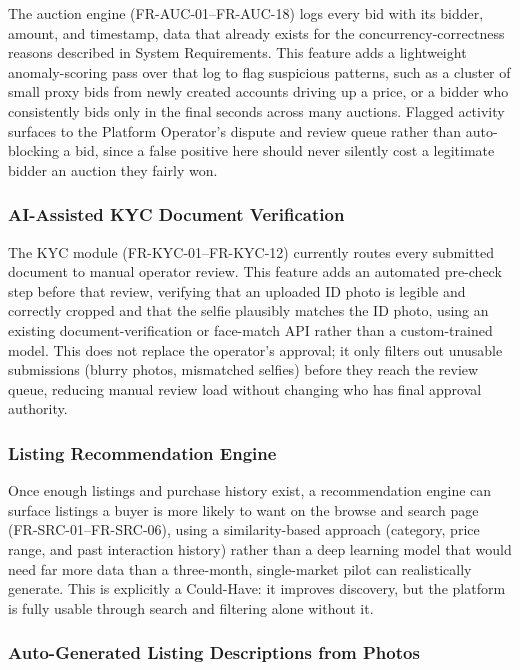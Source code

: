 \documentclass[11pt,a4paper]{article}
\begin{document}
The auction engine (FR-AUC-01--FR-AUC-18) logs every bid with its bidder, amount, and timestamp, data that
already exists for the concurrency-correctness reasons described in System Requirements. This feature
adds a lightweight anomaly-scoring pass over that log to flag suspicious patterns, such as a cluster of
small proxy bids from newly created accounts driving up a price, or a bidder who consistently bids only
in the final seconds across many auctions. Flagged activity surfaces to the Platform Operator's
dispute and review queue rather than auto-blocking a bid, since a false positive here should never
silently cost a legitimate bidder an auction they fairly won.

\subsubsection*{AI-Assisted KYC Document Verification}

The KYC module (FR-KYC-01--FR-KYC-12) currently routes every submitted document to manual operator review. This
feature adds an automated pre-check step before that review, verifying that an uploaded ID photo is
legible and correctly cropped and that the selfie plausibly matches the ID photo, using an existing
document-verification or face-match API rather than a custom-trained model. This does not replace the
operator's approval; it only filters out unusable submissions (blurry photos, mismatched selfies) before
they reach the review queue, reducing manual review load without changing who has final approval
authority.

\subsubsection*{Listing Recommendation Engine}

Once enough listings and purchase history exist, a recommendation engine can surface listings a buyer is
more likely to want on the browse and search page (FR-SRC-01--FR-SRC-06), using a similarity-based approach
(category, price range, and past interaction history) rather than a deep learning model that would need
far more data than a three-month, single-market pilot can realistically generate. This is explicitly a
Could-Have: it improves discovery, but the platform is fully usable through search and filtering alone
without it.

\subsubsection*{Auto-Generated Listing Descriptions from Photos}
\end{document}
